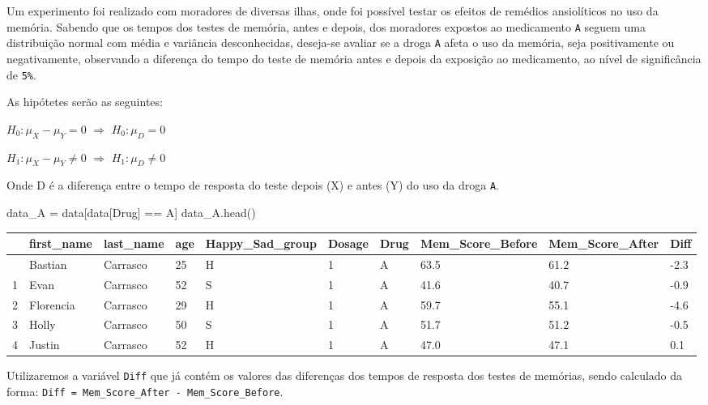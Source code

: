 \documentclass[
  letterpaper,
  DIV=11,
  numbers=noendperiod]{scrreprt}
\newenvironment{Shaded}{\begin{snugshade}}{\end{snugshade}}
\newcommand{\NormalTok}[1]{\textcolor[rgb]{0.00,0.23,0.31}{#1}}
\newcommand{\OperatorTok}[1]{\textcolor[rgb]{0.37,0.37,0.37}{#1}}
\newcommand{\StringTok}[1]{\textcolor[rgb]{0.13,0.47,0.30}{#1}}
\begin{document}
Um experimento foi realizado com moradores de diversas ilhas, onde foi
possível testar os efeitos de remédios ansiolíticos no uso da memória.
Sabendo que os tempos dos testes de memória, antes e depois, dos
moradores expostos ao medicamento \texttt{A} seguem uma distribuição
normal com média e variância desconhecidas, deseja-se avaliar se a droga
\texttt{A} afeta o uso da memória, seja positivamente ou negativamente,
observando a diferença do tempo do teste de memória antes e depois da
exposição ao medicamento, ao nível de significância de \texttt{5\%}.

As hipótetes serão as seguintes:

\(H_{0} : \mu_{X} - \mu_{Y} = 0\) \(\Rightarrow\)
\(H_{0} : \mu_{D} = 0\)

\(H_{1} : \mu_{X} - \mu_{Y} \neq 0\) \(\Rightarrow\)
\(H_{1} : \mu_{D} \neq 0\)

Onde D é a diferença entre o tempo de resposta do teste depois (X) e
antes (Y) do uso da droga \texttt{A}.

\begin{Shaded}
\begin{Highlighting}[]
\NormalTok{data\_A }\OperatorTok{=}\NormalTok{ data[data[}\StringTok{\textquotesingle{}Drug\textquotesingle{}}\NormalTok{] }\OperatorTok{==} \StringTok{\textquotesingle{}A\textquotesingle{}}\NormalTok{]}
\NormalTok{data\_A.head()}
\end{Highlighting}
\end{Shaded}

\begin{longtable}[]{@{}llllllllll@{}}
\toprule\noalign{}
& first\_name & last\_name & age & Happy\_Sad\_group & Dosage & Drug &
Mem\_Score\_Before & Mem\_Score\_After & Diff \\
\midrule\noalign{}
\endhead
\bottomrule\noalign{}
\endlastfoot
0 & Bastian & Carrasco & 25 & H & 1 & A & 63.5 & 61.2 & -2.3 \\
1 & Evan & Carrasco & 52 & S & 1 & A & 41.6 & 40.7 & -0.9 \\
2 & Florencia & Carrasco & 29 & H & 1 & A & 59.7 & 55.1 & -4.6 \\
3 & Holly & Carrasco & 50 & S & 1 & A & 51.7 & 51.2 & -0.5 \\
4 & Justin & Carrasco & 52 & H & 1 & A & 47.0 & 47.1 & 0.1 \\
\end{longtable}

Utilizaremos a variável \texttt{Diff} que já contém os valores das
diferenças dos tempos de resposta dos testes de memórias, sendo
calculado da forma:
\texttt{Diff\ =\ Mem\_Score\_After\ -\ Mem\_Score\_Before}.
\end{document}
